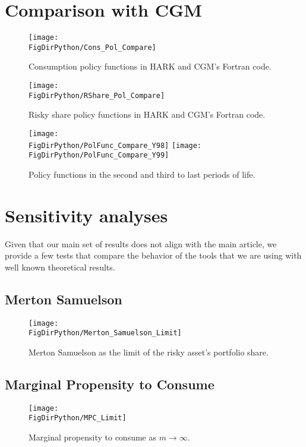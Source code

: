 \documentclass[../CGMPort.tex]{subfiles}
\begin{document}
\section{Comparison with CGM}\label{sec:Comparison}

\begin{figure}
	\texttt{[image: \\FigDirPython/Cons\_Pol\_Compare]}
	\caption{Consumption policy functions in HARK and CGM's Fortran code.}
\end{figure}

\begin{figure}
	\texttt{[image: \\FigDirPython/RShare\_Pol\_Compare]}
	\caption{Risky share policy functions in HARK and CGM's Fortran code.}
\end{figure}

\begin{figure}
	\texttt{[image: \\FigDirPython/PolFunc\_Compare\_Y98]}
	\texttt{[image: \\FigDirPython/PolFunc\_Compare\_Y99]}
	\caption{Policy functions in the second and third to last periods of life.}
\end{figure}

\section{Sensitivity analyses}\label{sec:Sensitivity}

Given that our main set of results does not align with the main article,
we provide a few tests that compare the behavior of the tools that we are using
with well known theoretical results.

\subsection{Merton Samuelson}

\begin{figure}
	\texttt{[image: \\FigDirPython/Merton\_Samuelson\_Limit]}
	\caption{Merton Samuelson as the limit of the risky asset's portfolio 
	share.}
\end{figure}

\subsection{Marginal Propensity to Consume}

\begin{figure}
	\texttt{[image: \\FigDirPython/MPC\_Limit]}
	\caption{Marginal propensity to consume as $m \rightarrow \infty$.}
\end{figure}
\end{document}
